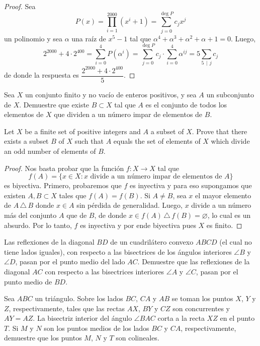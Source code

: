 \begin{proof}
	Sea
	\[P(x)=\prod_{i=1}^{2000}(x^i+1)=\sum_{j=0}^{\deg P}c_jx^j\]
	un polinomio y sea $\alpha$ una raíz de $x^5-1$ tal que $\alpha^4+\alpha^3+\alpha^2+\alpha+1=0$. Luego,
	\[2^{2000}+4\cdot 2^{400}=\sum_{i=0}^4 P(\alpha^i)=\sum_{j=0}^{\deg P}c_j\cdot\sum_{i=0}^4\alpha^{ij}=5\sum_{5\,\mid\,j}c_j\]
	de donde la respuesta es $\dfrac{2^{2000}+4\cdot 2^{400}}{5}$.
\end{proof}

\begin{probEG}[MOSP 1999]
	Sea $X$ un conjunto finito y no vacío de enteros positivos, y sea $A$ un subconjunto de $X$. Demuestre que existe $B\subset X$ tal que $A$ es el conjunto de todos los elementos de $X$ que dividen a un número impar de elementos de $B$.
	\begin{hint}
		Let $X$ be a finite set of positive integers and $A$ a subset of $X$. Prove that there exists a subset $B$ of $X$ such that $A$ equals the set of elements of $X$ which divide an odd number of elements of $B$.
	\end{hint}
\end{probEG}

\begin{proof}
	Nos basta probar que la función $f:X\to X$ tal que
	\[f(A)=\{x\in X:x\text{ divide a un número impar de elementos de }A\}\]
	es biyectiva. Primero, probaremos que $f$ es inyectiva y para eso supongamos que existen $A,B\subset X$ tales que $f(A)=f(B)$. Si $A\ne B$, sea $x$ el mayor elemento de $A\,\triangle\,B$ donde $x\in A$ sin pérdida de generalidad. Luego, $x$ divide a un número más del conjunto $A$ que de $B$, de donde $x\in f(A)\,\triangle\,f(B)=\varnothing$, lo cual es un absurdo. Por lo tanto, $f$ es inyectiva y por ende biyectiva pues $X$ es finito.
\end{proof}


\begin{probEG}
	Las reflexiones de la diagonal $BD$ de un cuadrilátero convexo $ABCD$ (el cual no tiene lados iguales), con respecto a las bisectrices de los ángulos interiores $\angle B$ y $\angle D$, pasan por el punto medio del lado $AC$. Demuestre que las reflexiones de la diagonal $AC$ con respecto a las bisectrices interiores $\angle A$ y $\angle C$, pasan por el punto medio de $BD$.
\end{probEG}

\begin{probEG}
	Sea $ABC$ un triángulo. Sobre los lados $BC$, $CA$ y $AB$ se toman los puntos $X$, $Y$ y $Z$, respectivamente, tales que las rectas $AX$, $BY$ y $CZ$ son concurrentes y $AY=AZ$. La bisectriz interior del ángulo $\angle BAC$ corta a la recta $XZ$ en el punto $T$. Si $M$ y $N$ son los puntos medios de los lados $BC$ y $CA$, respectivamente, demuestre que los puntos $M$, $N$ y $T$ son colineales.
\end{probEG}


